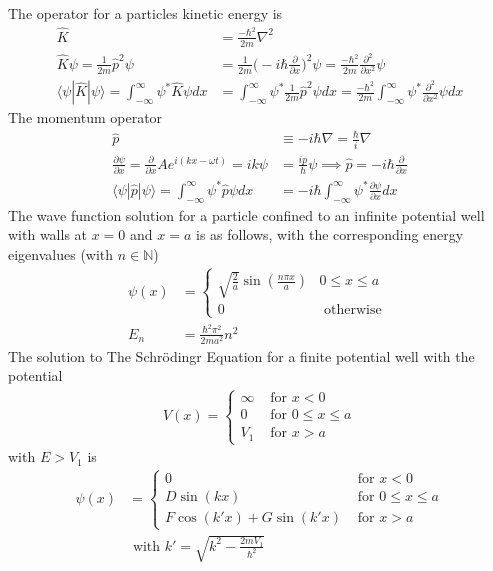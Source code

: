 The operator for a particles kinetic energy is
\begin{align}
	\hat{K}&=\frac{-\hbar^2}{2m}\nabla^2 \\
	\hat{K}\psi = \frac{1}{2m}\hat{p}^2\psi &= \frac{1}{2m}\bigg(-i\hbar\frac{\partial}{\partial x}\bigg)^2\psi = \frac{-\hbar^2}{2m}\frac{\partial^2}{\partial x^2}\psi \\
	\langle\psi| \hat{K}|\psi \rangle = \int_{-\infty}^{\infty}\psi^*\hat{K}\psi dx &= \int_{-\infty}^{\infty}\psi^*\frac{1}{2m}\hat{p}^2\psi dx = \frac{-\hbar^2}{2m}\int_{-\infty}^{\infty}\psi^*\frac{\partial^2}{\partial x^2}\psi dx
\end{align}
The momentum operator
\begin{align}
	\hat{p}&\equiv-i\hbar\nabla = \frac{\hbar}{i}\nabla \\
	\frac{\partial \psi}{\partial x}=\frac{\partial}{\partial x}Ae^{i(kx-\omega t)}=ik\psi&=\frac{ip}{\hbar}\psi \implies\hat{p} = -i\hbar \frac{\partial}{\partial x} \\
	\langle\psi| \hat{p}|\psi \rangle = \int_{-\infty}^{\infty} \psi^* \hat{p} \psi dx &= -i\hbar \int_{-\infty}^{\infty} \psi^* \frac{\partial \psi}{\partial x} dx
\end{align}
The wave function solution for a particle confined to an infinite potential well with walls at $x=0$ and $x=a$ is as follows, with the corresponding energy eigenvalues (with $n\in\mathbb{N}$)
\begin{align}
	\psi(x) &=
	\begin{cases}
		\sqrt{\frac{2}{a}}\sin\left(\frac{n\pi x}{a}\right) &  0\leq x \leq a\\
		0 &  \textrm{ otherwise }
	\end{cases} \\
	E_n &=\frac{\hbar^2\pi^2}{2ma^2}n^2
\end{align}
The solution to The Schr\"{o}dingr Equation for a finite potential well with the potential
\begin{align}
	V(x)=
	\begin{cases}
		\infty & \textrm{ for } x<0 \\
		0 & \textrm{ for } 0 \leq x \leq a \\
		V_1 & \textrm{ for } x>a
	\end{cases}
\end{align}
with $E>V_1$ is
\begin{align}
	\psi(x) &=
	\begin{cases}
		0 & \textrm{ for } x<0 \\
		D\sin(kx) & \textrm{ for } 0 \leq x \leq a \\
		F\cos(k'x)+G\sin(k'x) & \textrm{ for } x>a
	\end{cases} \\
	& \textrm{ with } k'=\sqrt{k^2-\frac{2mV_1}{\hbar^2}}
\end{align}
